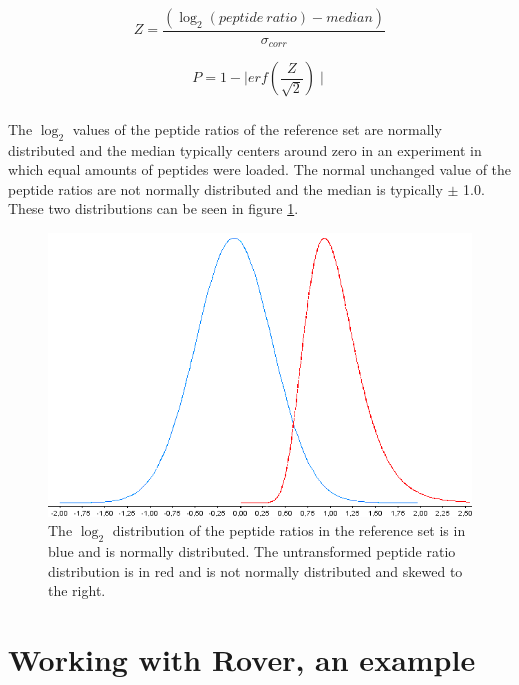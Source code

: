 \documentclass[11pt,a4paper,oneside,notitlepage]{book}
\begin{document}
\begin{equation}
Z = \dfrac{(\log _{2} (peptide \ ratio) - median) }{\sigma_{corr}}
\label{signForm} 
\end{equation}

\begin{equation}
P = 1 - \mid erf(\frac{Z}{\sqrt{2}})\mid
\label{pValue} 
\end{equation}

\paragraph{}The $\log_{2}$ values of the peptide ratios of the reference set are normally distributed and the median typically centers around zero in an experiment in which equal amounts of peptides were loaded. The normal unchanged value of the peptide ratios are not normally distributed and the median is typically $\pm$ 1.0. These two distributions can be seen in figure \ref{distribution}.

\begin{figure}[H]
\begin{center}
\includegraphics[scale=0.4]{distribution.png}
\caption{The $\log_{2}$ distribution of the peptide ratios in the reference set is in blue and is normally distributed. The untransformed peptide ratio distribution is in red and is not normally distributed and skewed to the right.}
\label{distribution}
\end{center}
\end{figure}


\chapter{Working with Rover, an example}
\end{document}
